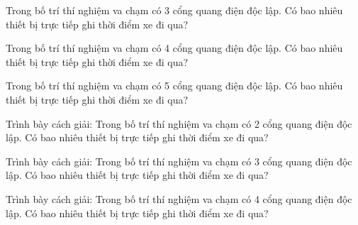\begin{ex}
Trong bố trí thí nghiệm va chạm có 3 cổng quang điện độc lập. Có bao nhiêu thiết bị trực tiếp ghi thời điểm xe đi qua?
\end{ex}

\begin{ex}
Trong bố trí thí nghiệm va chạm có 4 cổng quang điện độc lập. Có bao nhiêu thiết bị trực tiếp ghi thời điểm xe đi qua?
\end{ex}

\begin{ex}
Trong bố trí thí nghiệm va chạm có 5 cổng quang điện độc lập. Có bao nhiêu thiết bị trực tiếp ghi thời điểm xe đi qua?
\end{ex}

\begin{bt}
Trình bày cách giải: Trong bố trí thí nghiệm va chạm có 2 cổng quang điện độc lập. Có bao nhiêu thiết bị trực tiếp ghi thời điểm xe đi qua?
\end{bt}

\begin{bt}
Trình bày cách giải: Trong bố trí thí nghiệm va chạm có 3 cổng quang điện độc lập. Có bao nhiêu thiết bị trực tiếp ghi thời điểm xe đi qua?
\end{bt}

\begin{bt}
Trình bày cách giải: Trong bố trí thí nghiệm va chạm có 4 cổng quang điện độc lập. Có bao nhiêu thiết bị trực tiếp ghi thời điểm xe đi qua?
\end{bt}

